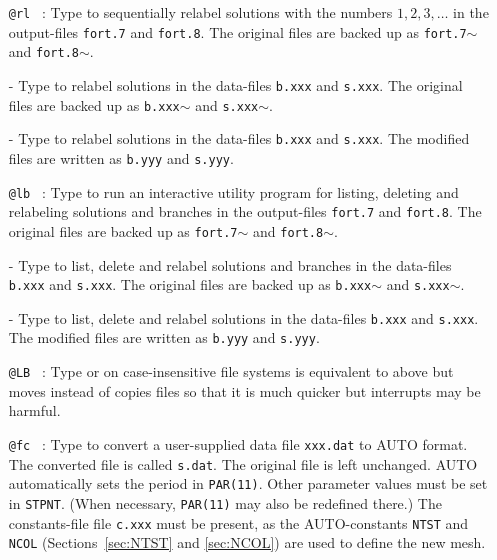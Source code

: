 \documentclass[12pt]{report}
\begin{document}
\begin{itemize}
\item[\tt @rl]~:
  Type  to sequentially relabel solutions with the numbers $1,2,3,\ldots$
  in the output-files {\tt fort.7} and {\tt fort.8}.
  The original files are backed up as
{\tt fort.7$\sim$} and {\tt fort.8$\sim$}. 
  \item[-]
  Type  to relabel solutions
  in the data-files {\tt b.xxx} and {\tt s.xxx}.
  The original files are backed up as {\tt b.xxx$\sim$} and {\tt s.xxx$\sim$}. 
\item[-]
  Type  to relabel solutions
  in the data-files {\tt b.xxx} and {\tt s.xxx}.
  The modified files are written as {\tt b.yyy} and {\tt s.yyy}. 

\item[\tt @lb]~:
  Type  to run an interactive utility program
  for listing, deleting and relabeling solutions and branches
  in the output-files {\tt fort.7} and {\tt fort.8}.
  The original files are backed up as
{\tt fort.7$\sim$} and {\tt fort.8$\sim$}. 
  \item[-]
  Type  to list, delete and relabel solutions and branches
  in the data-files {\tt b.xxx} and {\tt s.xxx}.
  The original files are backed up as {\tt b.xxx$\sim$} and {\tt s.xxx$\sim$}. 
\item[-]
  Type  to list, delete and relabel solutions
  in the data-files {\tt b.xxx} and {\tt s.xxx}.
  The modified files are written as {\tt b.yyy} and {\tt s.yyy}. 

\item[\tt @LB]~:
  Type  or  on case-insensitive file
  systems is equivalent to  above but moves instead of
  copies files so that it is much quicker but interrupts may be harmful.

\item[\tt @fc]~:
  Type  to convert a user-supplied data file {\tt xxx.dat}
  to {\cal AUTO} format. The converted file is called {\tt s.dat}.
  The original file is left unchanged.
  {\cal AUTO} automatically sets the period in {\tt PAR(11)}.
  Other parameter values must be set in {\tt STPNT}. (When necessary,
  {\tt PAR(11)} may also be redefined there.) 
  The constants-file file {\tt c.xxx} must be present, as the 
  {\cal AUTO}-constants {\tt NTST} and {\tt NCOL} 
  (Sections~\ref{sec:NTST} and \ref{sec:NCOL}) are used to define the new mesh.
  

\end{itemize}
\end{document}
